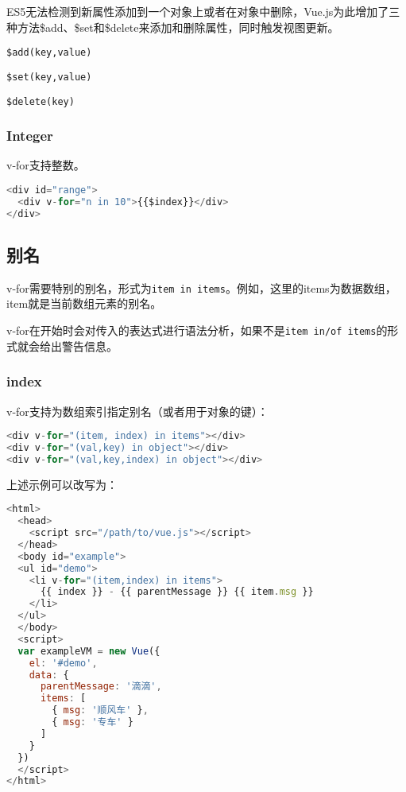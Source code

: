 ES5无法检测到新属性添加到一个对象上或者在对象中删除，Vue.js为此增加了三种方法\$add、\$set和\$delete来添加和删除属性，同时触发视图更新。

\begin{compactitem}
\item \texttt{\$add(key,value)}
\item \texttt{\$set(key,value)}
\item \texttt{\$delete(key)}
\end{compactitem}



\subsubsection{Integer}

v-for支持整数。


\begin{lstlisting}[language=JavaScript]
<div id="range">
  <div v-for="n in 10">{{$index}}</div>
</div>
\end{lstlisting}

\subsection{别名}

v-for需要特别的别名，形式为\texttt{item in items}。例如，这里的items为数据数组，item就是当前数组元素的别名。

v-for在开始时会对传入的表达式进行语法分析，如果不是\texttt{item in/of items}的形式就会给出警告信息。


\subsubsection{index}



v-for支持为数组索引指定别名（或者用于对象的键）：



\begin{lstlisting}[language=JavaScript]
<div v-for="(item, index) in items"></div>
<div v-for="(val,key) in object"></div>
<div v-for="(val,key,index) in object"></div>
\end{lstlisting}

上述示例可以改写为：


\begin{lstlisting}[language=JavaScript]
<html>
  <head>
    <script src="/path/to/vue.js"></script>
  </head>
  <body id="example">
  <ul id="demo">
    <li v-for="(item,index) in items">
      {{ index }} - {{ parentMessage }} {{ item.msg }}
    </li>
  </ul>
  </body>
  <script>
  var exampleVM = new Vue({
    el: '#demo',
    data: {
      parentMessage: '滴滴',
      items: [
        { msg: '顺风车' },
        { msg: '专车' }
      ]
    }
  })
  </script>
</html>
\end{lstlisting}

